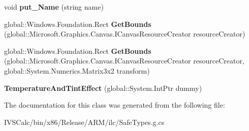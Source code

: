 \begin{DoxyCompactItemize}
\item 
\mbox{\label{class_microsoft_1_1_graphics_1_1_canvas_1_1_effects_1_1_temperature_and_tint_effect_adf0a816c81fcc171f9c60bc3f27288aa}} 
void {\bfseries put\+\_\+\+Name} (string name)
\item 
\mbox{\label{class_microsoft_1_1_graphics_1_1_canvas_1_1_effects_1_1_temperature_and_tint_effect_a110ff3583fb45b80ced1adb8beb3b37e}} 
global\+::\+Windows.\+Foundation.\+Rect {\bfseries Get\+Bounds} (global\+::\+Microsoft.\+Graphics.\+Canvas.\+I\+Canvas\+Resource\+Creator resource\+Creator)
\item 
\mbox{\label{class_microsoft_1_1_graphics_1_1_canvas_1_1_effects_1_1_temperature_and_tint_effect_aa1c4ce395cadd2b55228ea1a45617bb1}} 
global\+::\+Windows.\+Foundation.\+Rect {\bfseries Get\+Bounds} (global\+::\+Microsoft.\+Graphics.\+Canvas.\+I\+Canvas\+Resource\+Creator resource\+Creator, global\+::\+System.\+Numerics.\+Matrix3x2 transform)
\item 
\mbox{\label{class_microsoft_1_1_graphics_1_1_canvas_1_1_effects_1_1_temperature_and_tint_effect_a81f3532465d1de1b98e13a50b2571a0f}} 
{\bfseries Temperature\+And\+Tint\+Effect} (global\+::\+System.\+Int\+Ptr dummy)
\end{DoxyCompactItemize}


The documentation for this class was generated from the following file\+:\begin{DoxyCompactItemize}
\item 
I\+V\+S\+Calc/bin/x86/\+Release/\+A\+R\+M/ilc/Safe\+Types.\+g.\+cs\end{DoxyCompactItemize}
